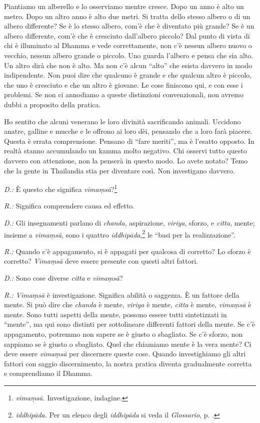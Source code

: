 Piantiamo un alberello e lo osserviamo mentre cresce. Dopo un anno è
alto un metro. Dopo un altro anno è alto due metri. Si tratta dello
stesso albero o di un albero differente? Se è lo stesso albero, com'è
che è diventato più grande? Se è un albero differente, com'è che è
cresciuto dall'albero piccolo? Dal punto di vista di chi è illuminato al
Dhamma e vede correttamente, non c'è nessun albero nuovo o vecchio,
nessun albero grande o piccolo. Uno guarda l'albero e pensa che sia
alto. Un altro dirà che non è alto. Ma non c'è alcun ``alto'' che esista
davvero in modo indipendente. Non puoi dire che qualcuno è grande e che
qualcun altro è piccolo, che uno è cresciuto e che un altro è giovane.
Le cose finiscono qui, e con esse i problemi. Se non ci annodiamo a
queste distinzioni convenzionali, non avremo dubbi a proposito della
pratica.

Ho sentito che alcuni venerano le loro divinità sacrificando animali.
Uccidono anatre, galline e mucche e le offrono ai loro dèi, pensando che
a loro farà piacere. Questa è errata comprensione. Pensano di ``fare
meriti'', ma è l'esatto opposto. In realtà stanno accumulando un
kamma molto negativo. Chi osservi tutto questo davvero con
attenzione, non la penserà in questo modo. Lo avete notato? Temo che la
gente in Thailandia stia per diventare così. Non investigano davvero.

\emph{D.:} È questo che significa \emph{vīmaṃsā}?\footnote{\emph{vīmaṃsā.}
  Investigazione, indagine.}

\emph{R.:} Significa comprendere causa ed effetto.

\emph{D.:} Gli insegnamenti parlano di \emph{chanda}, aspirazione,
\emph{viriya}, sforzo, e \emph{citta}, mente; insieme a \emph{vīmaṃsā},
sono i quattro \emph{iddhipāda},\footnote{\emph{iddhipāda.} Per un
  elenco degli \emph{iddhipāda} si veda il \emph{Glossario}, p. \pageref{glossary-iddhipada}.} le ``basi
per la realizzazione''.

\emph{R.:} Quando c'è appagamento, si è appagati per qualcosa di corretto? Lo
sforzo è corretto? \emph{Vīmaṃsā} deve essere presente con questi altri
fattori.

\emph{D.:} Sono cose diverse \emph{citta} e \emph{vīmaṃsā}?

\emph{R.:} \emph{Vīmaṃsā} è investigazione. Significa abilità o saggezza. È un
fattore della mente. Si può dire che \emph{chanda} è mente,
\emph{viriya} è mente, \emph{citta} è mente, \emph{vīmaṃsā} è mente.
Sono tutti aspetti della mente, possono essere tutti sintetizzati in
``mente'', ma qui sono distinti per sottolineare differenti fattori
della mente. Se c'è appagamento, potremmo non sapere se è giusto o
sbagliato. Se c'è sforzo, non sappiamo se è giusto o sbagliato. Quel che
chiamiamo mente è la vera mente? Ci deve essere \emph{vīmaṃsā} per
discernere queste cose. Quando investighiamo gli altri fattori con
saggio discernimento, la nostra pratica diventa gradualmente corretta e
comprendiamo il Dhamma.

